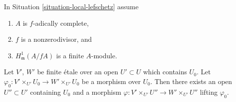 \begin{lemma}
\label{lemma-fully-faithful-general}
In Situation \ref{situation-local-lefschetz} assume
\begin{enumerate}
\item $A$ is $f$-adically complete,
\item $f$ is a nonzerodivisor, and
\item $H^1_\mathfrak m(A/fA)$ is a finite $A$-module.
\end{enumerate}
Let $V'$, $W'$ be finite \'etale over an open $U' \subset U$
which contains $U_0$. Let
$\varphi_0 : V' \times_{U'} U_0 \to W' \times_{U'} U_0$
be a morphism over $U_0$.
Then there exists an open $U'' \subset U'$
containing $U_0$ and a morphism
$\varphi : V' \times_{U'} U'' \to W' \times_{U'} U''$
lifting $\varphi_0$.
\end{lemma}

